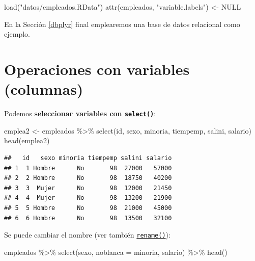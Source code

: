 \documentclass[
]{book}
\newenvironment{Shaded}{\begin{snugshade}}{\end{snugshade}}
\newcommand{\AttributeTok}[1]{\textcolor[rgb]{0.77,0.63,0.00}{#1}}
\newcommand{\ConstantTok}[1]{\textcolor[rgb]{0.00,0.00,0.00}{#1}}
\newcommand{\FunctionTok}[1]{\textcolor[rgb]{0.00,0.00,0.00}{#1}}
\newcommand{\NormalTok}[1]{#1}
\newcommand{\OtherTok}[1]{\textcolor[rgb]{0.56,0.35,0.01}{#1}}
\newcommand{\SpecialCharTok}[1]{\textcolor[rgb]{0.00,0.00,0.00}{#1}}
\newcommand{\StringTok}[1]{\textcolor[rgb]{0.31,0.60,0.02}{#1}}
\theoremstyle{break}
\theoremstyle{nonumberplain}
\begin{document}
\begin{Shaded}
\begin{Highlighting}[]
\FunctionTok{load}\NormalTok{(}\StringTok{"datos/empleados.RData"}\NormalTok{)}
\FunctionTok{attr}\NormalTok{(empleados, }\StringTok{"variable.labels"}\NormalTok{) }\OtherTok{\textless{}{-}} \ConstantTok{NULL}                  
\end{Highlighting}
\end{Shaded}

En la Sección \ref{dbplyr} final emplearemos una base de datos relacional como ejemplo.

\hypertarget{dplyr-variables}{%
\section{Operaciones con variables (columnas)}\label{dplyr-variables}}

Podemos \textbf{seleccionar variables con \href{https://dplyr.tidyverse.org/reference/select.html}{\texttt{select()}}}:

\begin{Shaded}
\begin{Highlighting}[]
\NormalTok{emplea2 }\OtherTok{\textless{}{-}}\NormalTok{ empleados }\SpecialCharTok{\%\textgreater{}\%} \FunctionTok{select}\NormalTok{(id, sexo, minoria, tiempemp, salini, salario)}
\FunctionTok{head}\NormalTok{(emplea2)}
\end{Highlighting}
\end{Shaded}

\begin{verbatim}
##   id   sexo minoria tiempemp salini salario
## 1  1 Hombre      No       98  27000   57000
## 2  2 Hombre      No       98  18750   40200
## 3  3  Mujer      No       98  12000   21450
## 4  4  Mujer      No       98  13200   21900
## 5  5 Hombre      No       98  21000   45000
## 6  6 Hombre      No       98  13500   32100
\end{verbatim}

Se puede cambiar el nombre (ver también \href{https://dplyr.tidyverse.org/reference/rename.html}{\texttt{rename()}}):

\begin{Shaded}
\begin{Highlighting}[]
\NormalTok{empleados }\SpecialCharTok{\%\textgreater{}\%} \FunctionTok{select}\NormalTok{(sexo, }\AttributeTok{noblanca =}\NormalTok{ minoria, salario) }\SpecialCharTok{\%\textgreater{}\%} \FunctionTok{head}\NormalTok{()}
\end{Highlighting}
\end{Shaded}
\end{document}
